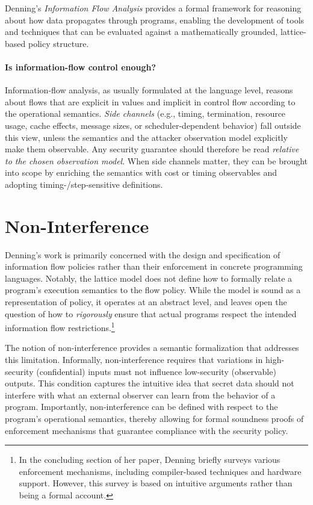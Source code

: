 \documentclass[12pt,a4paper,twoside]{book}
\begin{document}
Denning's \textit{Information Flow Analysis} provides a formal framework for reasoning about how data propagates through programs, enabling the development of tools and techniques that can be evaluated against a mathematically grounded, lattice-based policy structure.

\paragraph{Is information-flow control enough?}
Information-flow analysis, as usually formulated at the language level, reasons
about flows that are explicit in values and implicit in control flow according to
the operational semantics\cite{sabelfeld2003language}.
\emph{Side channels} (e.g., timing, termination,
resource usage, cache effects, message sizes, or scheduler-dependent behavior)\cite{kelsey1998side}
fall outside this view, unless the semantics and the attacker observation model
explicitly make them observable.
Any security guarantee should therefore be read
\emph{relative to the chosen observation model}.
When side channels matter, they can be brought into scope by enriching the semantics with cost or timing
observables and adopting timing-/step-sensitive definitions\cite{197207}.

\section{Non-Interference}
\label{background:noninterference}
Denning's work\cite{denning1976lattice} is primarily concerned with the design and specification of information flow policies rather than their enforcement in concrete programming languages. Notably, the lattice model does not define how to formally relate a program's execution semantics to the flow policy. While the model is sound as a representation of policy, it operates at an abstract level, and leaves open the question of how to \textit{rigorously} ensure that actual programs respect the intended information flow restrictions.\footnote{In the concluding section of her paper, Denning briefly surveys various enforcement mechanisms, including compiler-based techniques and hardware support. However, this survey is based on intuitive arguments rather than being a formal account.}

The notion of non-interference\cite{goguen1982security} provides a semantic formalization that addresses this limitation. Informally, non-interference requires that variations in high-security (confidential) inputs must not influence low-security (observable) outputs\cite{volpano1996sound}. This condition captures the intuitive idea that secret data should not interfere with what an external observer can learn from the behavior of a program. Importantly, non-interference can be defined with respect to the program's operational semantics, thereby allowing for formal soundness proofs of enforcement mechanisms that guarantee compliance with the security policy\cite{volpano1996sound}.
\end{document}
